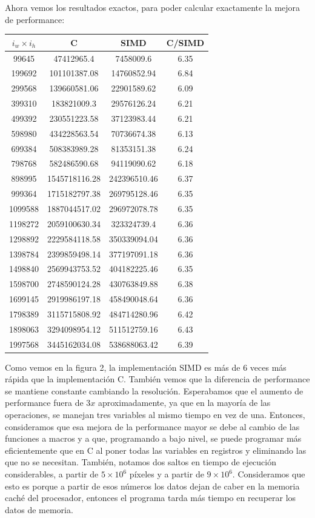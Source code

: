 Ahora vemos los resultados exactos, para poder calcular exactamente la mejora de performance:\\

\begin{center}
\begin{tabular}[H]{|c|c|c|c|}\hline
$i_w \times i_h$ & \textbf{C} & \textbf{SIMD} & \textbf{C/SIMD} \\\hline
99645 & 47412965.4 & 7458009.6 & 6.35\\
199692 & 101101387.08 & 14760852.94 & 6.84\\
299568 & 139660581.06 & 22901589.62 & 6.09\\
399310 & 183821009.3 & 29576126.24 & 6.21\\
499392 & 230551223.58 & 37123983.44 & 6.21\\
598980 & 434228563.54 & 70736674.38 & 6.13\\
699384 & 508383989.28 & 81353151.38 & 6.24\\
798768 & 582486590.68 & 94119090.62 & 6.18\\
898995 & 1545718116.28 & 242396510.46 & 6.37\\
999364 & 1715182797.38 & 269795128.46 & 6.35\\
1099588 & 1887044517.02 & 296972078.78 & 6.35\\
1198272 & 2059100630.34 & 323324739.4 & 6.36\\
1298892 & 2229584118.58 & 350339094.04 & 6.36\\
1398784 & 2399859498.14 & 377197091.18 & 6.36\\	
1498840 & 2569943753.52 & 404182225.46 & 6.35\\
1598700 & 2748590124.28 & 430763849.88 & 6.38\\
1699145 & 2919986197.18 & 458490048.64 & 6.36\\
1798389 & 3115715808.92 & 484714280.96 & 6.42\\
1898063 & 3294098954.12 & 511512759.16 & 6.43\\
1997568 & 3445162034.08 & 538688063.42 & 6.39\\\hline

\end{tabular}
\end{center}

Como vemos en la figura 2, la implementación SIMD es más de 6 veces más rápida que la implementación C. También vemos que la diferencia de performance se mantiene constante cambiando la resolución. Esperabamos que el aumento de performance fuera de $3x$ aproximadamente, ya que en la mayoría de las operaciones, se manejan tres variables al mismo tiempo en vez de una. Entonces, consideramos que esa mejora de la performance mayor se debe al cambio de las funciones a macros y a que, programando a bajo nivel, se puede programar más eficientemente que en C al poner todas las variables en registros y eliminando las que no se necesitan.
También, notamos dos saltos en tiempo de ejecución considerables, a partir de $5 \times 10^6$ píxeles y a partir de $9 \times 10^6$. Consideramos que esto es porque a partir de esos números los datos dejan de caber en la memoria caché del procesador, entonces el programa tarda más tiempo en recuperar los datos de memoria.